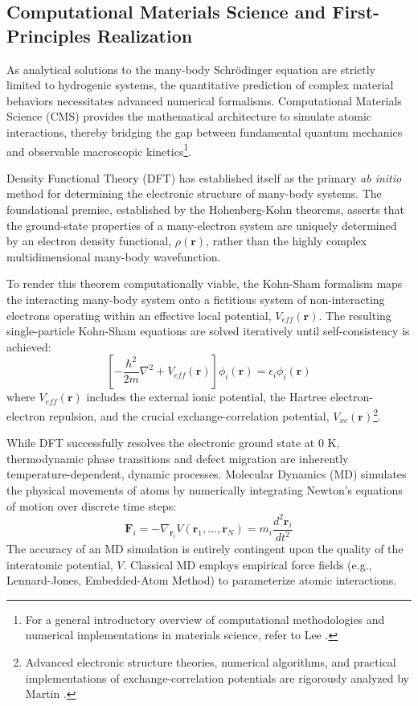 \documentclass[10pt,a4paper]{article}
\begin{document}
\subsection{Computational Materials Science and First-Principles Realization}

As analytical solutions to the many-body Schrödinger equation are strictly limited to hydrogenic systems, the quantitative prediction of complex material behaviors necessitates advanced numerical formalisms. Computational Materials Science (CMS) provides the mathematical architecture to simulate atomic interactions, thereby bridging the gap between fundamental quantum mechanics and observable macroscopic kinetics\footnote{For a general introductory overview of computational methodologies and numerical implementations in materials science, refer to Lee \cite{lee2011}.}.

Density Functional Theory (DFT) has established itself as the primary \textit{ab initio} method for determining the electronic structure of many-body systems. The foundational premise, established by the Hohenberg-Kohn theorems, asserts that the ground-state properties of a many-electron system are uniquely determined by an electron density functional, $\rho(\mathbf{r})$, rather than the highly complex multidimensional many-body wavefunction.

To render this theorem computationally viable, the Kohn-Sham formalism maps the interacting many-body system onto a fictitious system of non-interacting electrons operating within an effective local potential, $V_{eff}(\mathbf{r})$. The resulting single-particle Kohn-Sham equations are solved iteratively until self-consistency is achieved:
$$ \left[ -\frac{\hbar^2}{2m}\nabla^2 + V_{eff}(\mathbf{r}) \right] \phi_i(\mathbf{r}) = \epsilon_i \phi_i(\mathbf{r}) $$
where $V_{eff}(\mathbf{r})$ includes the external ionic potential, the Hartree electron-electron repulsion, and the crucial exchange-correlation potential, $V_{xc}(\mathbf{r})$\footnote{Advanced electronic structure theories, numerical algorithms, and practical implementations of exchange-correlation potentials are rigorously analyzed by Martin \cite{martin2004}.}. 

While DFT successfully resolves the electronic ground state at $0 \text{ K}$, thermodynamic phase transitions and defect migration are inherently temperature-dependent, dynamic processes. Molecular Dynamics (MD) simulates the physical movements of atoms by numerically integrating Newton's equations of motion over discrete time steps:
$$ \mathbf{F}_i = -\nabla_{\mathbf{r}_i} V(\mathbf{r}_1, \dots, \mathbf{r}_N) = m_i \frac{d^2 \mathbf{r}_i}{dt^2} $$
The accuracy of an MD simulation is entirely contingent upon the quality of the interatomic potential, $V$. Classical MD employs empirical force fields (e.g., Lennard-Jones, Embedded-Atom Method) to parameterize atomic interactions.
\end{document}
